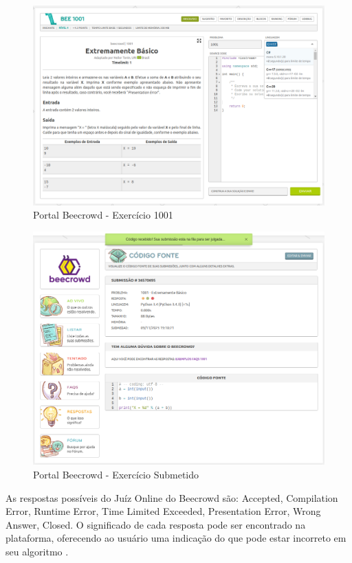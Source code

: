 \begin{figure}[h!]
	   \centering
            \caption{Portal Beecrowd - Exercício 1001}
            \label{fig:ModeloConceitual}
	   	\includegraphics[scale=0.3]{pictures/beecrowd_1001.png}
\end{figure}

\begin{figure}[h!]
	   \centering
            \caption{Portal Beecrowd - Exercício Submetido}
            \label{fig:ModeloConceitual}
	   	\includegraphics[scale=0.3]{pictures/beecrowd_submetido.png}
\end{figure}

As respostas possíveis do Juíz Online do Beecrowd são: Accepted, Compilation Error, Runtime Error, Time Limited Exceeded, Presentation Error, Wrong Answer, Closed. O significado de cada resposta pode ser encontrado na plataforma, oferecendo ao usuário uma indicação do que pode estar incorreto em seu algoritmo \cite{beecrowd}.

